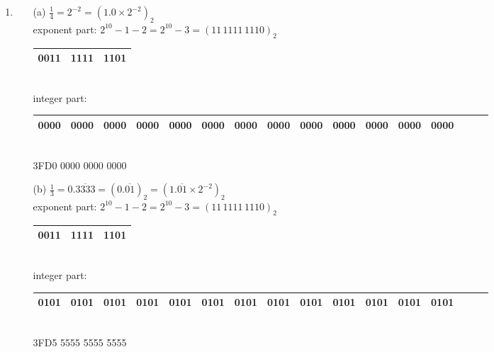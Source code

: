 \documentclass[UTF8]{ctexart}
\begin{document}
\begin{enumerate}
\item \begin{itemize}
\item[(a)] $\frac{1}{4} = 2^{-2} = (1.0 \times 2^{-2})_2$ \\
exponent part: $2^{10} - 1 - 2 = 2^{10} - 3 = (11 \, 1111 \, 1110)_2$ \\
\begin{tabular}{|c|c|c|}
\hline
0011 & 1111 & 1101\\
\hline
\end{tabular} \\
integer part: \\
\begin{tabular}{|c|c|c|c|c|c|c|c|c|c|c|c|c|c|c|c|}
\hline
0000 & 0000 & 0000 & 0000 & 0000 & 0000 & 0000 & 0000 & 0000 & 0000 & 0000 & 0000 & 0000\\
\hline
\end{tabular} \\
3FD0 0000 0000 0000
\item[(b)] $\frac{1}{3} = 0.\overline{3333} = (0.\overline{01})_2 = (1.\overline{01} \times 2^{-2})_2$ \\
exponent part: $2^{10} - 1 - 2= 2^{10} - 3 = (11 \, 1111 \, 1110)_2$ \\
\begin{tabular}{|c|c|c|}
\hline
0011 & 1111 & 1101\\
\hline
\end{tabular} \\
integer part: \\
\begin{tabular}{|c|c|c|c|c|c|c|c|c|c|c|c|c|c|c|c|}
\hline
0101 & 0101 & 0101 & 0101 & 0101 & 0101 & 0101 & 0101 & 0101 & 0101 & 0101 & 0101 & 0101\\
\hline
\end{tabular} \\
3FD5 5555 5555 5555
\end{itemize}
\end{enumerate}
\end{document}
